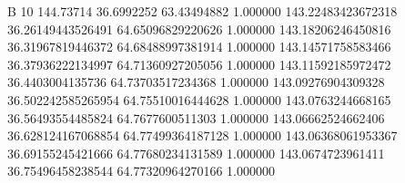 


B		10
144.73714	36.6992252	63.43494882	1.000000
143.22483423672318	36.26149443526491	64.65096829220626	1.000000
143.18206246450816	36.31967819446372	64.68488997381914	1.000000
143.14571758583466	36.37936222134997	64.71360927205056	1.000000
143.11592185972472	36.4403004135736	64.73703517234368	1.000000
143.09276904309328	36.502242585265954	64.75510016444628	1.000000
143.0763244668165	36.56493554485824	64.7677600511303	1.000000
143.06662524662406	36.628124167068854	64.77499364187128	1.000000
143.06368061953367	36.69155245421666	64.77680234131589	1.000000
143.0674723961411	36.75496458238544	64.77320964270166	1.000000
